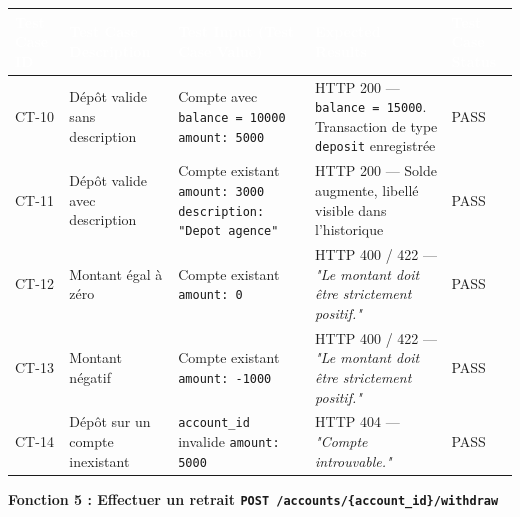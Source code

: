 \documentclass[12pt,a4paper,landscape]{article}
\begin{document}
\begin{longtable}{|L{2cm}|L{5cm}|L{6.5cm}|L{5cm}|L{2.5cm}|}
\hline
{}
\textbf{\textcolor{white}{Test Case ID}} &
\textbf{\textcolor{white}{Test Case Description}} &
\textbf{\textcolor{white}{Test Input (Test Case Value)}} &
\textbf{\textcolor{white}{Expected Results}} &
\textbf{\textcolor{white}{Test Case Status}} \\
\hline
CT-10 &
Dépôt valide sans description &
Compte avec \texttt{balance = 10000} \newline \texttt{amount: 5000} &
HTTP 200 — \texttt{balance = 15000}. Transaction de type \texttt{deposit} enregistrée &
PASS \\
\hline
{}
CT-11 &
Dépôt valide avec description &
Compte existant \newline \texttt{amount: 3000} \newline \texttt{description: "Depot agence"} &
HTTP 200 — Solde augmente, libellé visible dans l'historique &
PASS \\
\hline
CT-12 &
Montant égal à zéro &
Compte existant \newline \texttt{amount: 0} &
HTTP 400 / 422 — \textit{"Le montant doit être strictement positif."} &
PASS \\
\hline
{}
CT-13 &
Montant négatif &
Compte existant \newline \texttt{amount: -1000} &
HTTP 400 / 422 — \textit{"Le montant doit être strictement positif."} &
PASS \\
\hline
CT-14 &
Dépôt sur un compte inexistant &
\texttt{account\_id} invalide \newline \texttt{amount: 5000} &
HTTP 404 — \textit{"Compte introuvable."} &
PASS \\
\hline
\end{longtable}

\vspace{0.3cm}
{\bfseries\large\textcolor{rowtitle}{Fonction 5 : Effectuer un retrait \quad \texttt{POST /accounts/\{account\_id\}/withdraw}}}
\vspace{0.2cm}
\end{document}
